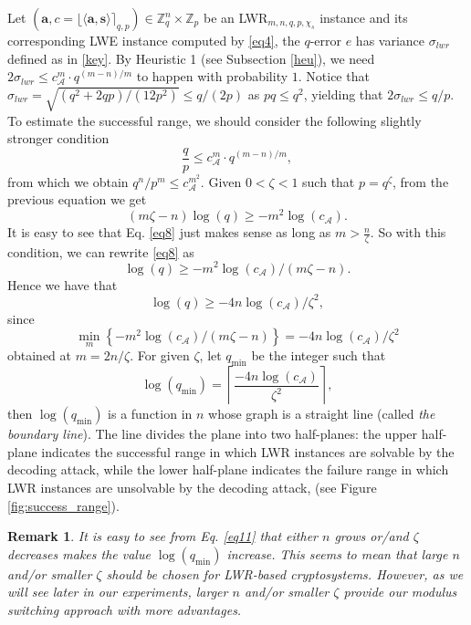 \documentclass{cta-author}
\newtheorem{remark}{Remark}{}
\begin{document}
Let $(\mathbf{a},c=\lfloor\langle \mathbf{a},\mathbf{s} \rangle \rceil_{q,p})\in \mathbb{Z}_q^n \times \mathbb{Z}_p$ be an LWR$_{m,n,q,p,\chi_s}$ instance and its corresponding LWE instance computed by \eqref{eq4}, the $q$-error $e$ has variance $\sigma_{lwr}$ defined as in \eqref{key}.
By Heuristic 1 (see Subsection \ref{heu}), we need
$2\sigma_{lwr} \leq c_{\mathcal{A}}^{m}\cdot q^{(m-n)/m}$
to happen with probability $1$.
Notice that $\sigma_{lwr}=\sqrt{(q^2+2qp)/(12p^2)} \leq q/(2p)$ as $pq \leq q^2$, yielding that $2\sigma_{lwr} \leq q/p$. 
To estimate the successful range, we should consider the following slightly stronger condition
\begin{equation*}
\frac{q}{p} \leq c_{\mathcal{A}}^{m}\cdot q^{(m-n)/m},
\end{equation*}
from which we obtain
$q^n/p^m \leq c_{\mathcal{A}}^{m^2}. $
Given $0<\zeta<1$ such that $p=q^{\zeta}$, from the previous equation we get 
\begin{equation}\label{eq8}
(m \zeta-n)\log (q) \geq -m^2 \log (c_{\mathcal{A}}).
\end{equation}
It is easy to see that Eq. \eqref{eq8} just makes sense as long as $m>\frac{n}{\zeta}$. So with this condition, we can rewrite \eqref{eq8} as
$$\log (q) \geq -m^2 \log (c_{\mathcal{A}})/(m \zeta-n).$$
Hence we have that
\begin{equation*}
\log (q) \geq -4n  \log (c_{\mathcal{A}})/\zeta^2,
\end{equation*}
since $$ \min_{m} \left\{-m^2 \log (c_{\mathcal{A}})/(m \zeta-n)\right\}=-4n \log (c_{\mathcal{A}})/\zeta^2$$ obtained at $m=2n/\zeta$. For given $\zeta$, let $q_{\text{min}}$ be the integer such that 
\begin{equation}\label{eq11}
\log (q_{\text{min}})=\left\lceil \frac{-4n  \log (c_{\mathcal{A}})}{\zeta^2} \right \rceil,
\end{equation}
then $\log (q_{\text{min}})$ is a function in $n$ whose graph is a straight line (called \textit{the boundary line}). The line divides the plane into two half-planes: the upper half-plane indicates the successful range in which LWR instances are solvable by the  decoding  attack, while the lower half-plane indicates the failure range in which LWR instances are unsolvable by the  decoding  attack, (see Figure \ref{fig:success_range}).

\begin{remark} 
	It is easy to see from Eq. \eqref{eq11} that either $n$ grows or/and $\zeta$ decreases makes the value $\log (q_{\text{min}})$ increase. This seems to mean that large $n$ and/or smaller $\zeta$ should be chosen for LWR-based cryptosystems. However, as we will see later in our experiments, larger $n$ and/or smaller $\zeta$ provide our modulus switching approach with more advantages. 
	
\end{remark} 
\end{document}

